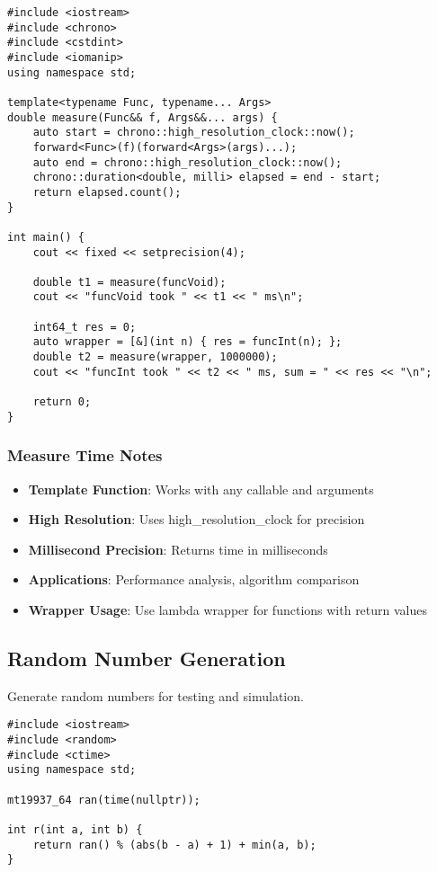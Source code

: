 \documentclass[11pt,a4paper]{article}
\begin{document}
\begin{lstlisting}[caption={Measure Time Utility}]
#include <iostream>
#include <chrono>
#include <cstdint>
#include <iomanip>  
using namespace std;

template<typename Func, typename... Args>
double measure(Func&& f, Args&&... args) {
    auto start = chrono::high_resolution_clock::now();
    forward<Func>(f)(forward<Args>(args)...);
    auto end = chrono::high_resolution_clock::now();
    chrono::duration<double, milli> elapsed = end - start;
    return elapsed.count();
}

int main() {
    cout << fixed << setprecision(4);

    double t1 = measure(funcVoid);
    cout << "funcVoid took " << t1 << " ms\n";

    int64_t res = 0;
    auto wrapper = [&](int n) { res = funcInt(n); };
    double t2 = measure(wrapper, 1000000);
    cout << "funcInt took " << t2 << " ms, sum = " << res << "\n";

    return 0;
}
\end{lstlisting}

\subsubsection*{Measure Time Notes}
\begin{itemize}
\item \textbf{Template Function}: Works with any callable and arguments
\item \textbf{High Resolution}: Uses high\_resolution\_clock for precision
\item \textbf{Millisecond Precision}: Returns time in milliseconds
\item \textbf{Applications}: Performance analysis, algorithm comparison
\item \textbf{Wrapper Usage}: Use lambda wrapper for functions with return values
\end{itemize}

\newpage

\subsection{Random Number Generation}
Generate random numbers for testing and simulation.

\begin{lstlisting}[caption={Random Number Generator}]
#include <iostream>
#include <random>
#include <ctime>
using namespace std;

mt19937_64 ran(time(nullptr));

int r(int a, int b) {
    return ran() % (abs(b - a) + 1) + min(a, b);
}
\end{lstlisting}
\end{document}
